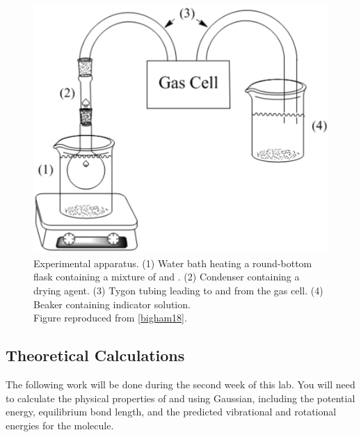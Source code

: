 \documentclass[nobib,nofonts,nols,nohyper]{tufte-handout}
\begin{document}
\begin{figure}[htb]
  \centering
    \includegraphics[width=.9\textwidth]{images/exp_setup_diagram.png}
  \caption{Experimental apparatus. (1) Water bath heating a round-bottom flask containing a mixture of  and . (2) Condenser containing a drying agent. (3) Tygon tubing leading to and from the gas cell. (4) Beaker containing indicator solution. \\
  Figure reproduced from \cref{bigham18}.}
  \label{fig:cell_filling}
\end{figure}



\subsection{Theoretical Calculations} %
\label{sub:theoretical_calculations}

The following work will be done during the second week of this lab. 
You will need to calculate the physical properties of  and  using Gaussian\autocite{gaussian16}, including the potential energy, equilibrium bond length, and the predicted vibrational and rotational energies for the molecule.
\end{document}
